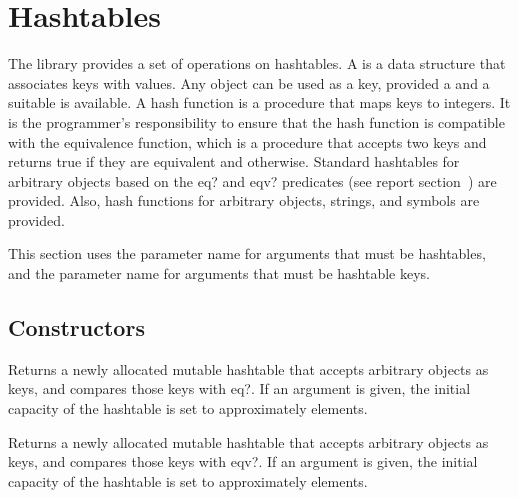 \chapter{Hashtables}
\label{hashtablechapter}

The  library provides a set of operations on
hashtables.
A  is a data structure that associates keys with values.
Any object can be used as a key, provided a 
and a suitable  is available.  A hash function is a
procedure that maps
keys to integers.
It is the programmer's responsibility to ensure that the hash function
is compatible with the equivalence function,
which is a procedure that accepts two keys and returns true if they
are equivalent and \schfalse{} otherwise.
Standard hashtables for arbitrary objects based on the {\cf eq?} and 
{\cf eqv?} predicates (see report section~) are provided.  
Also, hash functions for arbitrary objects, strings, and symbols are provided.

This section uses the  parameter name for arguments
that must be hashtables, and the  parameter name for
arguments that must be hashtable keys.

\section{Constructors}


\begin{entry}{%
}

Returns a newly allocated mutable hashtable that accepts
arbitrary objects as keys,
and compares those keys with {\cf eq?}. If an argument is given, the initial 
capacity of the hashtable is set to approximately  elements.

\end{entry}

\begin{entry}{%
}

Returns a newly allocated mutable hashtable that accepts
arbitrary objects as keys,
and compares those keys with {\cf eqv?}.
If an argument is given, the initial 
capacity of the hashtable is set to approximately  elements.

\end{entry}

